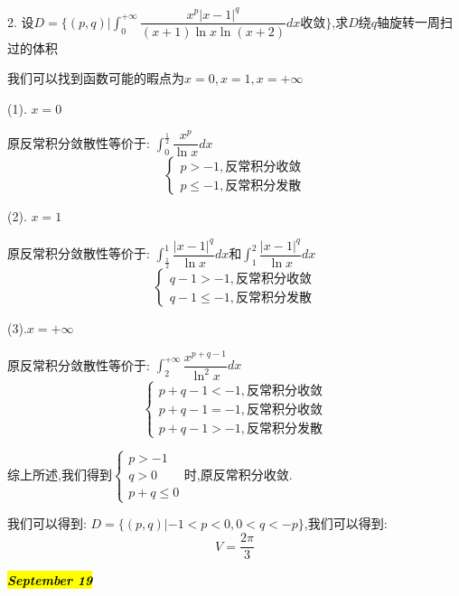2. 设$D=\{(p,q)|\int_{0}^{+\infty}\dfrac{x^p|x-1|^q}{(x+1)\ln x\ln(x+2)}dx\text{收敛}\}$,求$D$绕$q$轴旋转一周扫过的体积
\begin{solution}

	我们可以找到函数可能的暇点为$x=0,x=1,x=+\infty$
	
	(1). $x=0$
	
	原反常积分敛散性等价于:  $\int_{0}^{\frac{1}{2}}\dfrac{x^p}{\ln x}dx$
	$$\left\lbrace
	\begin{array}{l}
		p>-1,\text{反常积分收敛}\\
		p\leq-1,\text{反常积分发散}
	\end{array}
	\right. $$
	
	(2). $x=1$
	
	原反常积分敛散性等价于:  $\int_{\frac{1}{2}}^{1}\dfrac{|x-1|^q}{\ln x}dx$和$\int_{1}^{2}\dfrac{|x-1|^q}{\ln x}dx$
	$$\left\lbrace
	\begin{array}{l}
		q-1>-1,\text{反常积分收敛}\\
		q-1\leq-1,\text{反常积分发散}
	\end{array}
	\right. $$
	
	(3).$x=+\infty$
	
	原反常积分敛散性等价于:  $\int_{2}^{+\infty}\dfrac{x^{p+q-1}}{\ln^2 x}dx$
	$$\left\lbrace
	\begin{array}{l}
		p+q-1<-1,\text{反常积分收敛}\\
		p+q-1=-1,\text{反常积分收敛}\\
		p+q-1>-1,\text{反常积分发散}
	\end{array}
	\right. $$
	
	综上所述,我们得到$\left\lbrace
	\begin{array}{l}
		p>-1\\
		q>0\\
		p+q\leq 0
	\end{array}
	\right. $时,原反常积分收敛.
	
	我们可以得到:  $D=\{(p,q)|-1<p<0,0<q<-p\}$,我们可以得到:  
	$$V=\dfrac{2\pi}{3}$$
\end{solution}

\hl{\textbf{\textit{September 19}}}

